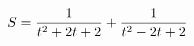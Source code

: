 \documentclass[preview]{standalone}
\begin{document}
\begin{align*}
\special{dvisvgm:raw <g id='unique000'>}S=\frac{1}{t^2+2t+2}+\frac{1}{t^2-2t+2}\special{dvisvgm:raw </g>}
\end{align*}
\end{document}
